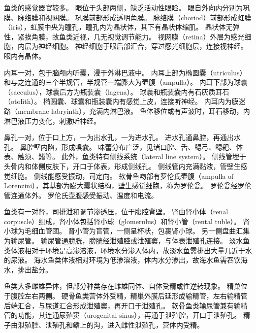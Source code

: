 \documentclass[11pt]{article}
\begin{document}
\newline

鱼类的感觉器官较多。
眼位于头部两侧，缺乏活动性眼睑。
眼自外向内分别为巩膜、脉络膜和视网膜。
巩膜前部形成透明角膜。
脉络膜（choriod）前部形成虹膜（iris），虹膜中央为瞳孔，瞳孔内为晶状体，其下有晶状体缩肌。
晶状体无弹性，紧挨角膜，故鱼类近视，几无视觉调节能力。
视网膜（retina）外层为感光细胞，内层为神经细胞。
神经细胞于眼后部汇合，穿过感光细胞层，连接视神经。
眼内有晶体。

\newline

内耳一对，包于脑颅内听囊，浸于外淋巴液中。
内耳上部为椭圆囊（utriculus）和与之连通的三个半规管，半规管一端膨大为壶腹（ampulla）。
内耳下部为球囊（sacculus），球囊后方为瓶装囊（lagena）。
球囊和瓶装囊内有石灰质耳石（otolith）。
椭圆囊、球囊和瓶装囊内有感觉上皮，连接听神经。
内耳内为膜迷路（membrane labryinth），充满内淋巴液。
鱼体移位或有声波时，耳石移动，内淋巴液压力变化，刺激听神经。

\newline

鼻孔一对，位于口上方，一为出水孔，一为进水孔。
进水孔通鼻腔，再通出水孔。
鼻腔壁内陷，形成嗅囊。
味蕾分布广泛，见诸口腔、舌、鳃弓、鳃耙、体表、触须、鳍等。
此外，鱼类特有侧线系统（lateral line system）。
侧线管埋于头骨内和体侧皮肤下，开口于体表，形成侧线孔。
侧线管内充满黏液，管壁生感觉细胞。
侧线能感受振动，司定向。
软骨鱼吻部有罗伦氏壶腹（ampulla of Lorenzini），其基部为膨大囊状结构，壁生感觉细胞，称为罗伦瓮。
罗伦瓮经罗伦管连通体外。
罗伦氏壶腹感受振动、温度和电流。

\newline

鱼类有一对肾，司排泄和调节渗透压，位于腹腔背壁。
肾由肾小体（renal corpuscle）组成，肾小体包括肾小球（glomerulus）和肾小管（rental tuble）。
肾小球为毛细血管团。
肾小管为盲管，一侧呈杯状，包裹肾小球。
另一侧盘曲汇集为输尿管。
输尿管通膀胱，膀胱经泄殖腔或泄殖窦，与体表泄殖孔连接。
淡水鱼类体液相对于环境是高渗溶液，环境水分渗入体内，故淡水鱼需排出大量几近于水的尿液。
海水鱼类体液相对环境为低渗溶液，体内水分渗出，故海水鱼需吞饮海水，排出盐分。

\newline

鱼类大多雌雄异体，但部分种类存在雌雄同体、自体受精或性逆转现象。
精巢位于腹腔左右两侧。
硬骨鱼类营体外受精，精巢外膜后延形成输精管，左右输精管后端汇合，与尿道汇合形成泄殖窦，再开口于泄殖孔。
软骨鱼类输尿管兼有输精管的功能，其连通尿殖窦（urogenital sinus），再通于泄殖腔，开口于泄殖孔。
精子由泄殖腔、泄殖孔和鳍上的沟，进入雌性泄殖孔，营体内受精。
\end{document}
